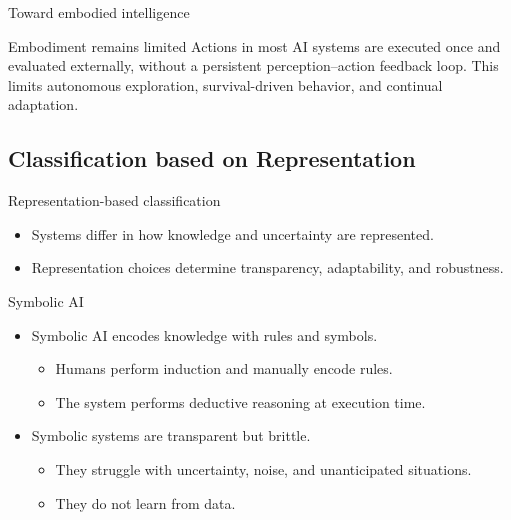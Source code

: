 \documentclass[12pt]{beamer}
\begin{document}
\begin{frame}{Toward embodied intelligence}
  \begin{warningbox}{Embodiment remains limited}
    Actions in most AI systems are executed once and evaluated externally, without a persistent
    perception--action feedback loop. This limits autonomous exploration, survival-driven behavior,
    and continual adaptation.
  \end{warningbox}
\end{frame}

\subsection{Classification based on Representation}

\begin{frame}{Representation-based classification}
  \begin{itemize}
    \item Systems differ in how knowledge and uncertainty are represented.
    \item Representation choices determine transparency, adaptability, and robustness.
  \end{itemize}
\end{frame}

\begin{frame}{Symbolic AI}
  \begin{itemize}
    \item Symbolic AI encodes knowledge with rules and symbols.
      \begin{itemize}
        \item Humans perform induction and manually encode rules.
        \item The system performs deductive reasoning at execution time.
      \end{itemize}
    \item Symbolic systems are transparent but brittle.
      \begin{itemize}
        \item They struggle with uncertainty, noise, and unanticipated situations.
        \item They do not learn from data.
      \end{itemize}
  \end{itemize}
\end{frame}
\end{document}
